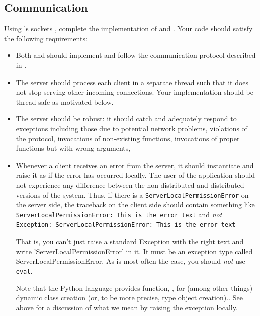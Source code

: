 \documentclass[a4paper]{article}
\begin{document}
\subsection{Communication} 
Using \python's sockets \cite{python-ipc}, complete the implementation of
 and . Your code should satisfy the
following requirements:
\begin{itemize}

  \item Both  and  should implement and
  follow the communication protocol described in .

  \item The server should process each client in a separate thread such that it
  does not stop serving other incoming connections. Your implementation should
  be thread safe as motivated below.

  \item The server should be robust: it should catch and adequately
    respond to exceptions including those due to potential network
    problems, violations of the protocol, invocations of non-existing
    functions, invocations of proper functions but with wrong
    arguments, \etc

  \item Whenever a client receives an error from the server, it should
    instantiate and raise it as if the error has occurred locally. The
    user of the  application should not experience
    any difference between the non-distributed and distributed
    versions of the system. Thus, if there is a
    \texttt{ServerLocalPermissionError} on the server side, the
    traceback on the client side should contain something like
    \texttt{ServerLocalPermissionError: This is the error text} and
    \emph{not} \texttt{Exception: ServerLocalPermissionError: This is
      the error text}
    
    That is, you can't just raise a standard Exception with the right
    text and write 'ServerLocalPermissionError' in it. It must be an
    exception type called ServerLocalPermissionError. As is most often
    the case, you should \emph{not} use \texttt{eval}.
    
    Note that the Python language provides function, , for
    (among other things) dynamic class creation (or, to be more
    precise, type object creation).\cite{python-library}. See above
    for a discussion of what we mean by raising the exception locally.
\end{itemize}
\end{document}
